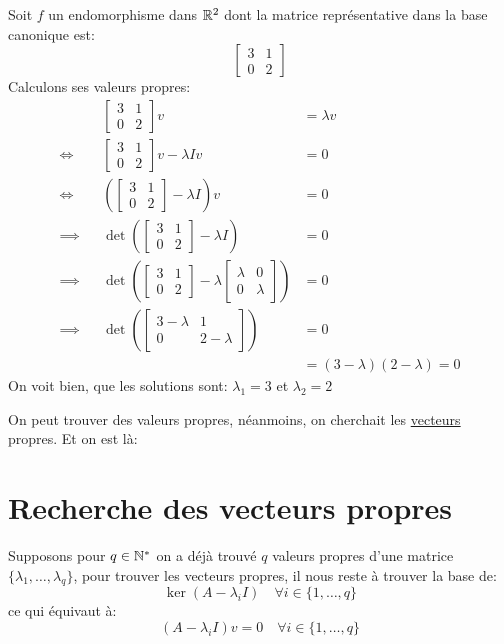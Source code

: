 \begin{eg}
   Soit $f$ un endomorphisme dans  $\mathbb{R}^2$ dont la matrice représentative dans la base canonique est:
   \[
       \begin{bmatrix} 3 & 1\\ 0 & 2 \end{bmatrix} 
   \] 
   Calculons ses valeurs propres:
   \begin{align*}
       && \begin{bmatrix} 3 & 1\\ 0 & 2 \end{bmatrix} v &= \lambda v \\
       \iff && \begin{bmatrix} 3 & 1\\ 0 & 2 \end{bmatrix} v - \lambda I v &= 0\\
       \iff && \left(\begin{bmatrix} 3 & 1\\ 0 & 2 \end{bmatrix}  - \lambda I\right)v  &= 0\\
       \implies && \det \left( \begin{bmatrix} 3 & 1\\ 0 & 2 \end{bmatrix}  - \lambda I \right) &= 0\\
       \implies && \det \left( \begin{bmatrix} 3 & 1\\ 0 & 2 \end{bmatrix}  - \lambda \begin{bmatrix} \lambda & 0\\ 0 & \lambda \end{bmatrix}  \right) &= 0\\
       \implies && \det \left( \begin{bmatrix} 3 - \lambda & 1\\ 0 & 2 - \lambda \end{bmatrix}\right) &= 0\\
                && &= (3-\lambda)(2 - \lambda) = 0
   \end{align*}
   On voit bien, que les solutions sont: $\lambda_1 = 3$ et  $\lambda_2 = 2$
\end{eg}
On peut trouver des valeurs propres, néanmoins, on cherchait les \underline{vecteurs} propres. Et on est là:
\section{Recherche des vecteurs propres}
Supposons pour $q \in \mathbb{N}^{*}$ on a déjà trouvé $q$ valeurs propres d'une matrice $\{ \lambda_1, \ldots, \lambda_q \}$, pour trouver les vecteurs propres, il nous reste à trouver la base de:
\[
    \ker(A - \lambda_iI) \quad \forall i \in \{1, \ldots, q\}
\] 
ce qui équivaut à:
\[
\left( A - \lambda_i I \right)v = 0 \quad \forall i \in \{1, \ldots, q\}
\] 

